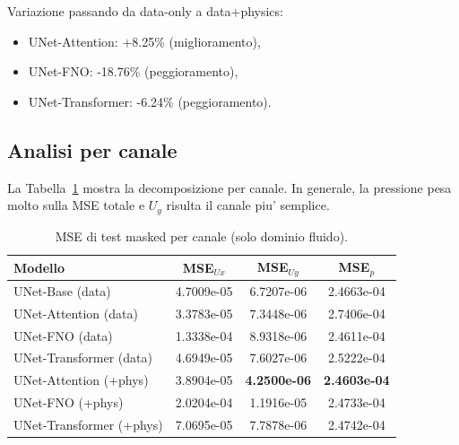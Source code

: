 \documentclass[final,3p,times]{elsarticle}
\begin{document}
Variazione passando da data-only a data+physics:
\begin{itemize}
    \item UNet-Attention: +8.25\% (miglioramento),
    \item UNet-FNO: -18.76\% (peggioramento),
    \item UNet-Transformer: -6.24\% (peggioramento).
\end{itemize}

\subsection{Analisi per canale}
La Tabella~\ref{tab:channels} mostra la decomposizione per canale. In generale, la pressione pesa molto sulla MSE totale e $U_y$ risulta il canale piu' semplice.

\begin{table}[htbp]
\centering
\caption{MSE di test masked per canale (solo dominio fluido).}
\label{tab:channels}
\begin{tabular}{lccc}
\toprule
Modello & MSE$_{Ux}$ & MSE$_{Uy}$ & MSE$_p$ \\
\midrule
UNet-Base (data) & 4.7009e-05 & 6.7207e-06 & 2.4663e-04 \\
UNet-Attention (data) & 3.3783e-05 & 7.3448e-06 & 2.7406e-04 \\
UNet-FNO (data) & 1.3338e-04 & 8.9318e-06 & 2.4611e-04 \\
UNet-Transformer (data) & 4.6949e-05 & 7.6027e-06 & 2.5222e-04 \\
UNet-Attention (+phys) & 3.8904e-05 & \textbf{4.2500e-06} & \textbf{2.4603e-04} \\
UNet-FNO (+phys) & 2.0204e-04 & 1.1916e-05 & 2.4733e-04 \\
UNet-Transformer (+phys) & 7.0695e-05 & 7.7878e-06 & 2.4742e-04 \\
\bottomrule
\end{tabular}
\end{table}
\end{document}
